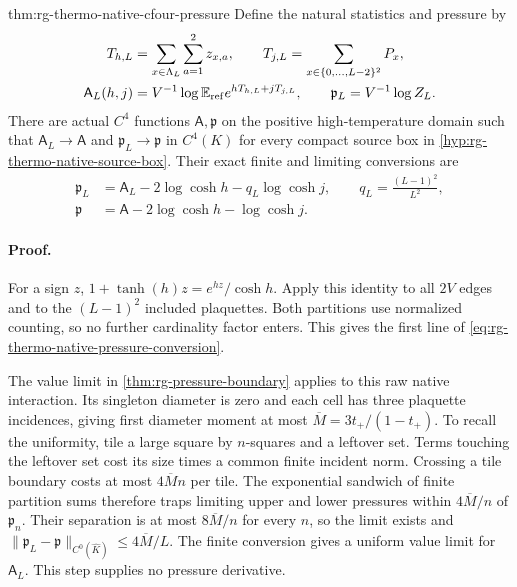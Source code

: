 {thm:rg-thermo-native-cfour-pressure}
Define the natural statistics and pressure by
\begin{equation}
 \begin{split}
 T_{h,L}&=\sum_{x\in\Lambda_L}\sum_{a=1}^2z_{x,a},\qquad
 T_{j,L}=\sum_{x\in\{0,\ldots,L-2\}^2}P_x,\\
 \mathsf A_L(h,j)&=V^{-1}\log\mathbb E_{\mathrm{ref}}
                          e^{hT_{h,L}+jT_{j,L}},\qquad
 \mathfrak p_L=V^{-1}\log Z_L.
 \end{split}
 \label{eq:rg-thermo-native-natural-pressure}
\end{equation}
There are actual \(C^4\) functions \(\mathsf A,\mathfrak p\) on the
positive high-temperature domain such that
\(\mathsf A_L\to\mathsf A\) and
\(\mathfrak p_L\to\mathfrak p\) in \(C^4(K)\) for every compact
source box in \cref{hyp:rg-thermo-native-source-box}. Their exact finite
and limiting conversions are
\begin{equation}
 \begin{split}
 \mathfrak p_L&=\mathsf A_L-2\log\cosh h-q_L\log\cosh j,
       \qquad q_L=\frac{(L-1)^2}{L^2},\\
 \mathfrak p&=\mathsf A-2\log\cosh h-\log\cosh j.
 \end{split}
 \label{eq:rg-thermo-native-pressure-conversion}
\end{equation}\thermoestablishedstatus


\paragraph{Proof.}
For a sign \(z\),
\(1+\tanh(h)z=e^{hz}/\cosh h\). Apply this identity to all \(2V\)
edges and to the \((L-1)^2\) included plaquettes. Both partitions use
normalized counting, so no further cardinality factor enters. This gives
the first line of \cref{eq:rg-thermo-native-pressure-conversion}.

The value limit in \cref{thm:rg-pressure-boundary} applies to this raw
native interaction. Its singleton diameter is zero and each cell has
three plaquette incidences, giving first diameter moment at most
\(\overline M=3t_+/(1-t_+)\). To recall the uniformity, tile a large
square by \(n\)-squares and a leftover set. Terms touching the leftover
set cost its size times a common finite incident norm. Crossing a tile
boundary costs at most \(4\overline M n\) per tile. The exponential
sandwich of finite partition sums therefore traps limiting upper and
lower pressures within \(4\overline M/n\) of \(\mathfrak p_n\).
Their separation is at most \(8\overline M/n\) for every \(n\), so
the limit exists and
\(\|\mathfrak p_L-\mathfrak p\|_{C^0(\widehat K)}
\le4\overline M/L\). The finite conversion gives a uniform value
limit for \(\mathsf A_L\). This step supplies no pressure derivative.

